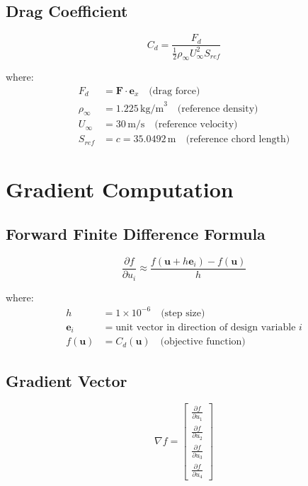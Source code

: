 \documentclass{article}
\begin{document}
\subsection{Drag Coefficient}
\begin{equation}
C_d = \frac{F_d}{\frac{1}{2}\rho_\infty U_\infty^2 S_{ref}}
\end{equation}

where:
\begin{align}
F_d &= \mathbf{F} \cdot \mathbf{e}_x \quad \text{(drag force)} \\
\rho_\infty &= 1.225 \, \text{kg/m}^3 \quad \text{(reference density)} \\
U_\infty &= 30 \, \text{m/s} \quad \text{(reference velocity)} \\
S_{ref} &= c = 35.0492 \, \text{m} \quad \text{(reference chord length)}
\end{align}

\section{Gradient Computation}

\subsection{Forward Finite Difference Formula}
\begin{equation}
\frac{\partial f}{\partial u_i} \approx \frac{f(\mathbf{u} + h \mathbf{e}_i) - f(\mathbf{u})}{h}
\end{equation}

where:
\begin{align}
h &= 1 \times 10^{-6} \quad \text{(step size)} \\
\mathbf{e}_i &= \text{unit vector in direction of design variable } i \\
f(\mathbf{u}) &= C_d(\mathbf{u}) \quad \text{(objective function)}
\end{align}

\subsection{Gradient Vector}
\begin{equation}
\nabla f = \begin{bmatrix}
\frac{\partial f}{\partial u_1} \\
\frac{\partial f}{\partial u_2} \\
\frac{\partial f}{\partial u_3} \\
\frac{\partial f}{\partial u_4}
\end{bmatrix}
\end{equation}
\end{document}
